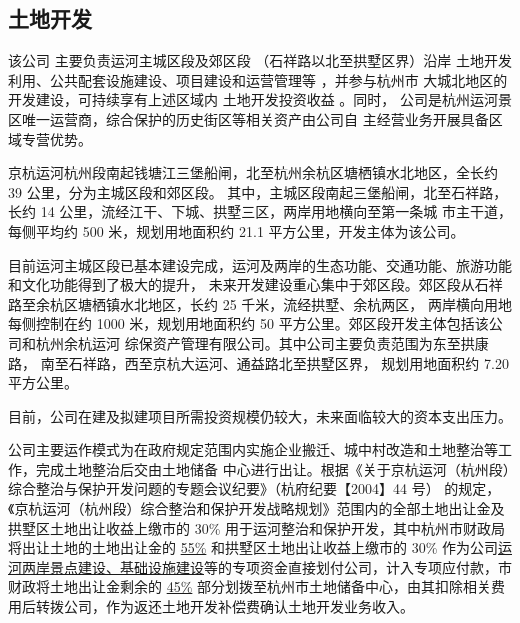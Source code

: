 \documentclass[H:\workspace\担保人财务信息2\杭州大运河\HangZhouText.tex]{subfiles}
\begin{document}
\subsection{土地开发}
该公司
主要负责运河主城区段及郊区段 （石祥路以北至拱墅区界）沿岸
土地开发利用、公共配套设施建设、项目建设和运营管理等 ，并参与杭州市
大城北地区的开发建设，可持续享有上述区域内 土地开发投资收益 。同时，
公司是杭州运河景区唯一运营商，综合保护的历史街区等相关资产由公司自
主经营业务开展具备区域专营优势。\par 

京杭运河杭州段南起钱塘江三堡船闸，北至杭州余杭区塘栖镇水北地区，全长约 39 公里，分为主城区段和郊区段。 
其中，主城区段南起三堡船闸，北至石祥路，长约 14 公里，流经江干、下城、拱墅三区，两岸用地横向至第一条城
市主干道，每侧平均约 500 米，规划用地面积约 21.1 平方公里，开发主体为该公司。\par 

目前运河主城区段已基本建设完成，运河及两岸的生态功能、交通功能、旅游功能和文化功能得到了极大的提升，
未来开发建设重心集中于郊区段。郊区段从石祥路至余杭区塘栖镇水北地区，长约 25 千米，流经拱墅、余杭两区，
两岸横向用地每侧控制在约 1000 米，规划用地面积约 50 平方公里。郊区段开发主体包括该公司和杭州余杭运河
综保资产管理有限公司。其中公司主要负责范围为东至拱康路， 南至石祥路，西至京杭大运河、通益路北至拱墅区界，
规划用地面积约 7.20 平方公里。\par 

目前，公司在建及拟建项目所需投资规模仍较大，未来面临较大的资本支出压力。\par 

公司主要运作模式为在政府规定范围内实施企业搬迁、城中村改造和土地整治等工作，完成土地整治后交由土地储备
中心进行出让。根据《关于京杭运河（杭州段）综合整治与保护开发问题的专题会议纪要》（杭府纪要【2004】44 号）
的规定，《京杭运河（杭州段）综合整治和保护开发战略规划》范围内的全部土地出让金及拱墅区土地出让收益上缴市的 
30\% 用于运河整治和保护开发，其中杭州市财政局将出让土地的土地出让金的 \underline{55\%} 和拱墅区土地出让收益上缴市的 
30\% 作为公司\underline{运河两岸景点建设、基础设施建设}等的专项资金直接划付公司，计入专项应付款，市财政将土地出让金剩余的 
\underline{45\%} 部分划拨至杭州市土地储备中心，由其扣除相关费用后转拨公司，作为返还土地开发补偿费确认土地开发业务收入。\par
\end{document}
